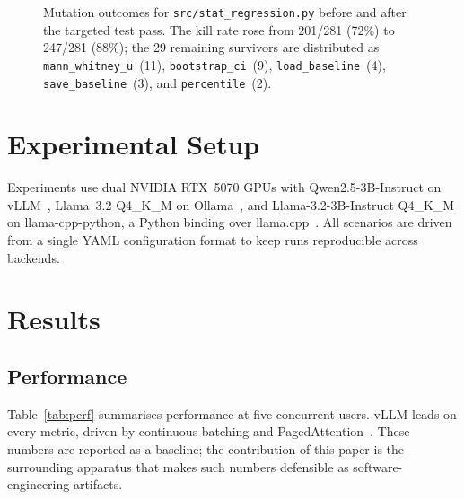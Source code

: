 \documentclass[sigconf,nonacm]{acmart}
\begin{document}
\begin{figure}[h]
\centering
{}
\caption{Mutation outcomes for \texttt{src/stat\_regression.py}
before and after the targeted test pass. The kill rate rose from
201/281 (72\%) to 247/281 (88\%); the 29 remaining survivors are
distributed as \texttt{mann\_whitney\_u}~(11), \texttt{bootstrap\_ci}~(9),
\texttt{load\_baseline}~(4), \texttt{save\_baseline}~(3), and
\texttt{percentile}~(2).}
\label{fig:mutbars}
\end{figure}

\section{Experimental Setup}
Experiments use dual NVIDIA RTX~5070 GPUs with Qwen2.5-3B-Instruct on
vLLM~\cite{vllm}, Llama~3.2 Q4\_K\_M on Ollama~\cite{ollama}, and
Llama-3.2-3B-Instruct Q4\_K\_M on llama-cpp-python, a Python binding
over llama.cpp~\cite{llamacpp}. All scenarios are driven from a single
YAML configuration format to keep runs reproducible across backends.

\section{Results}
\subsection{Performance}
Table~\ref{tab:perf} summarises performance at five concurrent users.
vLLM leads on every metric, driven by continuous batching and
PagedAttention~\cite{vllm}. These numbers are reported as a baseline;
the contribution of this paper is the surrounding apparatus that makes
such numbers defensible as software-engineering artifacts.
\end{document}
